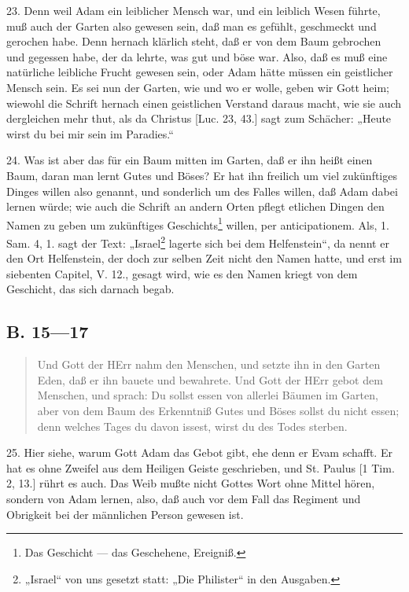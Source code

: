 23. Denn weil Adam ein leiblicher Mensch war, und ein leiblich Wesen führte, muß auch der Garten also gewesen sein, daß man es gefühlt, geschmeckt und gerochen habe. Denn hernach klärlich steht, daß er von dem Baum gebrochen und gegessen habe, der da lehrte, was gut und böse war. Also, daß es muß eine natürliche leibliche Frucht gewesen sein, oder Adam hätte müssen ein geistlicher Mensch sein. Es sei nun der Garten, wie und wo er wolle, geben wir Gott heim; wiewohl die Schrift hernach einen geistlichen Verstand daraus macht, wie sie auch dergleichen mehr thut, als da Christus [Luc. 23, 43.] sagt zum Schächer: „Heute wirst du bei mir sein im Paradies.“

24. Was ist aber das für ein Baum mitten im Garten, daß er ihn heißt einen Baum, daran man lernt Gutes und Böses? Er hat ihn freilich um viel zukünftiges Dinges willen also genannt, und sonderlich um des Falles willen, daß Adam dabei lernen würde; wie auch die Schrift an andern Orten pflegt etlichen Dingen den Namen zu geben um zukünftiges Geschichts\footnote{Das Geschicht — das Geschehene, Ereigniß.} willen, per anticipationem. Als, 1. Sam. 4, 1. sagt der Text: „Israel\footnote{„Israel“ von uns gesetzt statt: „Die Philister“ in den Ausgaben.} lagerte sich bei dem Helfenstein“, da nennt er den Ort Helfenstein, der doch zur selben Zeit nicht den Namen hatte, und erst im siebenten Capitel, V. 12., gesagt wird, wie es den Namen kriegt von dem Geschicht, das sich darnach begab.

\subsection[B. 15—17]{B. 15—17}

\begin{quote}
Und Gott der HErr nahm den Menschen, und setzte ihn in den Garten Eden, daß er ihn bauete und bewahrete. Und Gott der HErr gebot dem Menschen, und sprach: Du sollst essen von allerlei Bäumen im Garten, aber von dem Baum des Erkenntniß Gutes und Böses sollst du nicht essen; denn welches Tages du davon issest, wirst du des Todes sterben.
\end{quote}

25. Hier siehe, warum Gott Adam das Gebot gibt, ehe denn er Evam schafft. Er hat es
ohne Zweifel aus dem Heiligen Geiste geschrieben, und St. Paulus [1 Tim. 2, 13.] rührt es auch. Das Weib mußte nicht Gottes Wort ohne Mittel hören, sondern von Adam lernen, also, daß auch vor dem Fall das Regiment und Obrigkeit bei der männlichen Person gewesen ist.

